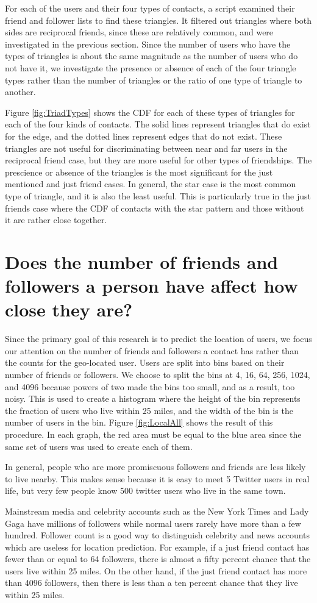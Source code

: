 For each of the users and their four types of contacts, a script examined their
friend and follower lists to find these triangles.
It filtered out triangles where both sides are reciprocal friends, since these
are relatively common, and were investigated in the previous section.
Since the number of users who have the types of triangles is about the same
magnitude as the number of users who do not have it, we investigate the
presence or absence of each of the four triangle types rather than the number
of triangles or the ratio of one type of triangle to another.

Figure \ref{fig:TriadTypes} shows the CDF for each of these types of triangles for each of the four kinds of contacts.
The solid lines represent triangles that do exist for the edge, and the dotted lines represent edges that do not exist.
These triangles are not useful for discriminating between near and far users in
the reciprocal friend case, but they are more useful for other types of
friendships.
The prescience or absence of the triangles is the most significant for the just
mentioned and just friend cases.
In general, the star case is the most common type of triangle, and it is also the least useful.
This is particularly true in the just friends case where the CDF of contacts with
the star pattern and those without it are rather close together.

\section{Does the number of friends and followers a person have affect how close they are?}

Since the primary goal of this research is to predict the location of users, we focus our attention on the number of friends and followers a contact has rather than the counts for the geo-located user. 
Users are split into bins based on their number of friends or followers.
We choose to split the bins at 4, 16, 64, 256, 1024, and 4096 because powers
of two made the bins too small, and as a result, too noisy.
This is used to create a histogram where the height of the bin represents the
fraction of users who live within 25 miles, and the width of the bin is the
number of users in the bin.
Figure \ref{fig:LocalAll} shows the result of this procedure.
In each graph, the red area must be equal to the blue area since the same set
of users was used to create each of them.

In general, people who are more promiscuous followers and friends are less
likely to live nearby. This makes sense because it is easy to meet 5 Twitter
users in real life, but very few people know 500 twitter users who live in the
same town.

Mainstream media and celebrity accounts such as the New York Times and Lady
Gaga have millions of followers while normal users rarely have more than a few
hundred.
Follower count is a good way to distinguish celebrity and news accounts which
are useless for location prediction.
For example, if a just friend contact has fewer than or equal to 64 followers,
there is almost a fifty percent chance that the users live within 25 miles. On
the other hand, if the just friend contact has more than 4096 followers, then
there is less than a ten percent chance that they live within 25 miles.

